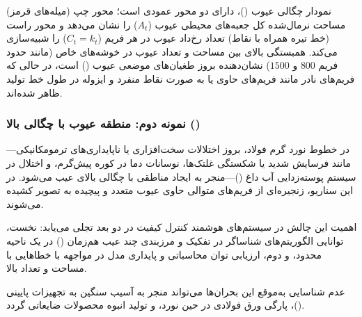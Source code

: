 \documentclass[a4paper, 10pt, twocolumn]{article}
\begin{document}
	\begin{table}[H]
		\centering
		\caption{توزیع فراوانی کلاس‌ها در نمونه اول}
		\label{tab:sample12}
	\end{table}
	
	
	نمودار چگالی عیوب ()،  دارای دو محور عمودی است؛ محور چپ (میله‌های قرمز) مساحت نرمال‌شده کل جعبه‌های محیطی عیوب ($A_t$) را نشان می‌دهد و محور راست (خط تیره همراه با نقاط) تعداد رخ‌داد عیوب در هر فریم ($C_t = k_t$) را شبیه‌سازی می‌کند. همبستگی بالای بین مساحت و تعداد عیوب در خوشه‌های خاص (مانند حدود فریم $800$ و $1500$) نشان‌دهنده بروز طغیان‌های موضعی عیوب () است، در حالی که فریم‌های نادر مانند فریم‌های حاوی  یا  به صورت نقاط منفرد و ایزوله در طول خط تولید ظاهر شده‌اند.
	
	
	\subsubsection*{نمونه دوم: منطقه عیوب با چگالی بالا ()}
	
	در خطوط نورد گرم فولاد، بروز اختلالات سخت‌افزاری یا ناپایداری‌های ترمومکانیکی—مانند فرسایش شدید یا شکستگی غلتک‌ها، نوسانات دما در کوره پیش‌گرم، و اختلال در سیستم پوسته‌زدایی آب داغ ()—منجر به ایجاد مناطقی با چگالی بالای عیب می‌شود. در این سناریو، زنجیره‌ای از فریم‌های متوالی حاوی عیوب متعدد و پیچیده به تصویر کشیده می‌شوند.
	
	اهمیت این چالش در سیستم‌های هوشمند کنترل کیفیت در دو بعد تجلی می‌یابد: نخست، توانایی الگوریتم‌های شناساگر در تفکیک و مرزبندی چند عیب هم‌زمان () در یک ناحیه محدود، و دوم، ارزیابی توان محاسباتی و پایداری مدل در مواجهه با خطاهایی با مساحت و تعداد بالا. 
	
	عدم شناسایی به‌موقع این بحران‌ها می‌تواند منجر به آسیب سنگین به تجهیزات پایینی ()، پارگی ورق فولادی در حین نورد، و تولید انبوه محصولات ضایعاتی گردد.
	
\end{document}
